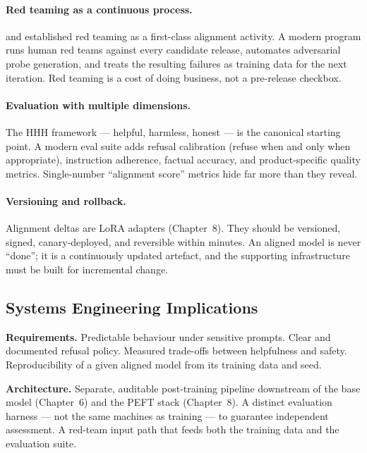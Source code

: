 \paragraph{Red teaming as a continuous process.}
\citet{ganguli2022redteaming} and \citet{perez2022redteaming}
established red teaming as a first-class alignment activity. A
modern program runs human red teams against every candidate
release, automates adversarial probe generation, and treats the
resulting failures as training data for the next iteration. Red
teaming is a cost of doing business, not a pre-release checkbox.

\paragraph{Evaluation with multiple dimensions.}
The HHH framework --- helpful, harmless, honest
\citep{askell2021general} --- is the canonical starting point. A
modern eval suite adds refusal calibration (refuse when and only
when appropriate), instruction adherence, factual accuracy, and
product-specific quality metrics. Single-number ``alignment score''
metrics hide far more than they reveal.

\paragraph{Versioning and rollback.}
Alignment deltas are LoRA adapters (Chapter~8). They should be
versioned, signed, canary-deployed, and reversible within minutes.
An aligned model is never ``done''; it is a continuously updated
artefact, and the supporting infrastructure must be built for
incremental change.

\subsection{Systems Engineering Implications}

\textbf{Requirements.}
Predictable behaviour under sensitive prompts. Clear and documented
refusal policy. Measured trade-offs between helpfulness and
safety. Reproducibility of a given aligned model from its training
data and seed.

\textbf{Architecture.}
Separate, auditable post-training pipeline downstream of the base
model (Chapter~6) and the PEFT stack (Chapter~8). A distinct evaluation
harness --- not the same machines as training --- to guarantee
independent assessment. A red-team input path that feeds both the
training data and the evaluation suite.

